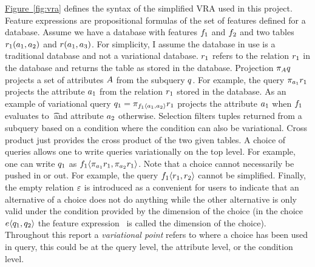 \documentclass[12pt]{article}
\newcommand{\figref}[1]{\hyperref[fig:#1]{Figure~\ref*{fig:#1}}}
\begin{document}
\figref{vra} defines the syntax of the simplified VRA used in this project.
Feature expressions are propositional formulas of the set of features defined
for a database. Assume we have a database with features $\fName_1$ and 
$\fName_2$ and two tables $\vRel_1 (\att_1, \att_2)$ and $\vRel (\att_1, \att_3)$. 
For simplicity, I assume the database in use is a traditional database and not 
a variational database. 
$\vRel_1$ refers to the relation $\vRel_1$ in the database and returns the table
as stored in the database. 
Projection $\vPrj \vQ$ projects a set of attributes $\vAttList$ from the subquery $\vQ$.
For example, the query $\vPrj [\att_1] \vRel_1$ projects the attribute $\att_1$ from the 
relation $\vRel_1$ stored in the database. As an example of variational query 
$\vQ_1 = \pi_{ \chc [\fName_1] {\att_1, \att_2}} \vRel_1$ projects the attribute $\att_1$ when
$\fName_1$ evaluates to \t\ and attribute $\att_2$ otherwise. Selection 
filters tuples returned from a subquery based on a condition where the condition can
also be variational. Cross product just provides the cross product of the 
two given tables. A choice of queries allows one to write queries variationally on
the top level. For example, one can write $\vQ_1$ as 
$\chc [\fName_1] {\vPrj [\att_1] \vRel_1, \vPrj [\att_2] \vRel_1}$. Note that a 
choice cannot necessarily be pushed in or out. For example, the query
$\chc [\fName_1] {\vRel_1, \vRel_2}$ cannot be simplified.
Finally, the empty relation $\empRel$ is introduced as a convenient for 
users to indicate that an alternative of a choice does not do anything while
the other alternative is only valid under the condition provided by the 
dimension of the choice (in the choice $\chc {\vQ_1, \vQ_2}$ the feature expression
\dimMeta\ is called the dimension of the choice).
Throughout this report a \emph{variational point} refers to where a choice
has been used in query, this could be at the query level, the attribute
level, or the condition level.
\end{document}
